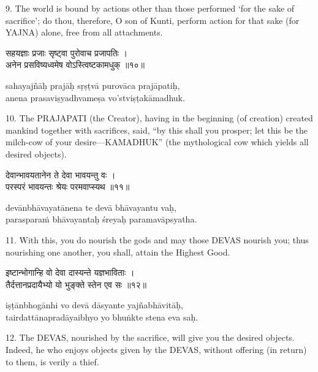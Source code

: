 9. The world is bound by actions other than those performed `for the sake of
sacrifice'; do thou, therefore, O son of Kunti, perform action for that sake
(for YAJNA) alone, free from all attachments.

\begin{gitaverse}
सहयज्ञाः प्रजाः सृष्ट्वा पुरोवाच प्रजापतिः । \\
अनेन प्रसविष्यध्वमेष वोऽस्त्विष्टकामधुक् ॥१०॥
\end{gitaverse}

\begin{transliteration}
sahayajñāḥ prajāḥ sṛṣṭvā purovāca prajāpatiḥ, \\
anena prasaviṣyadhvameṣa vo'stviṣṭakāmadhuk.
\end{transliteration}

10. The PRAJAPATI (the Creator), having in the beginning (of creation) created
mankind together with sacrifices, said, ``by this shall you prosper; let this
be the milch-cow of your desire---KAMADHUK'' (the mythological cow which yields
all desired objects).

\begin{gitaverse}
देवान्भावयतानेन ते देवा भावयन्तु वः । \\
परस्परं भावयन्तः श्रेयः परमवाप्स्यथ ॥११॥
\end{gitaverse}

\begin{transliteration}
devānbhāvayatānena te devā bhāvayantu vaḥ, \\
parasparaṁ bhāvayantaḥ śreyaḥ paramavāpsyatha.
\end{transliteration}

11. With this, you do nourish the gods and may those DEVAS nourish you; thus
nourishing one another, you shall, attain the Highest Good.

\begin{gitaverse}
इष्टान्भोगान्हि वो देवा दास्यन्ते यज्ञभाविताः । \\
तैर्दत्तानप्रदायैभ्यो यो भुङ्क्ते स्तेन एव सः ॥१२॥
\end{gitaverse}

\begin{transliteration}
iṣṭānbhogānhi vo devā dāsyante yajñabhāvitāḥ, \\
tairdattānapradāyaibhyo yo bhuṅkte stena eva saḥ.
\end{transliteration}

12. The DEVAS, nourished by the sacrifice, will give you the desired objects.
Indeed, he who enjoys objects given by the DEVAS, without offering (in return)
to them, is verily a thief.

